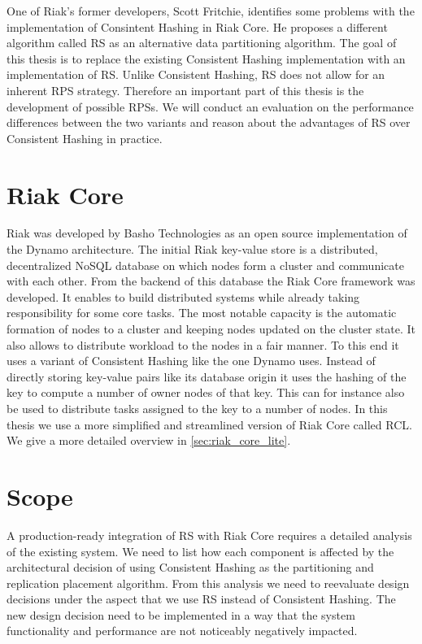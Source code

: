 One of Riak's former developers, Scott Fritchie, identifies some problems with the implementation of Consintent Hashing in Riak Core\cite{Fritchie2018}.
He proposes a different algorithm called \ac{RS}\cite{Miranda2014} as an alternative data partitioning algorithm.
The goal of this thesis is to replace the existing Consistent Hashing implementation with an implementation of \ac{RS}.
Unlike Consistent Hashing, \ac{RS} does not allow for an inherent \ac{RPS} strategy.
Therefore an important part of this thesis is the development of possible \acp{RPS}.
We will conduct an evaluation on the performance differences between the two variants and reason about the advantages of \ac{RS} over Consistent Hashing in practice.

\section{Riak Core}
\label{sec:riak_core}
Riak\cite{Basho2021} was developed by Basho Technologies as an open source implementation of the Dynamo architecture\cite{DeCandia2007}.
The initial Riak key-value store is a distributed, decentralized NoSQL database on which nodes form a cluster and communicate with each other.
From the backend of this database the Riak Core\cite{BashoCore2021} framework was developed.
It enables to build distributed systems while already taking responsibility for some core tasks.
The most notable capacity is the automatic formation of nodes to a cluster and keeping nodes updated on the cluster state\cite{Riak2011}.
It also allows to distribute workload to the nodes in a fair manner.
To this end it uses a variant of Consistent Hashing\cite{Karger1997} like the one Dynamo uses.
Instead of directly storing key-value pairs like its database origin it uses the hashing of the key to compute a number of owner nodes of that key.
This can for instance also be used to distribute tasks assigned to the key to a number of nodes.
In this thesis we use a more simplified and streamlined version of Riak Core called \ac{RCL}.
We give a more detailed overview in \cref{sec:riak_core_lite}.

\section{Scope}
A production-ready integration of \ac{RS} with Riak Core requires a detailed analysis of the existing system.
We need to list how each component is affected by the architectural decision of using Consistent Hashing as the partitioning and replication placement algorithm.
From this analysis we need to reevaluate design decisions under the aspect that we use \ac{RS} instead of Consistent Hashing.
The new design decision need to be implemented in a way that the system functionality and performance are not noticeably negatively impacted.

